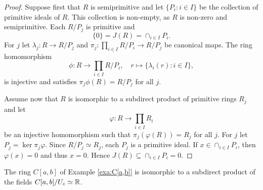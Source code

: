 \begin{proof}
	Suppose first that $R$ is semiprimitive and let $\{P_i:i\in I\}$ be the collection of 
	primitive ideals of $R$. This collection is non-empty, as 
        $R$ is non-zero and semiprimitive. Each $R/P_j$ is primitive and 
	\[
 \{0\}=J(R)=\cap_{i\in I}P_i.
 \]
 For $j$ let $\lambda_j\colon R\to
	R/P_j$ and $\pi_j\colon \prod_{i\in I}R/P_i\to R/P_j$ be canonical maps. 
	The ring homomorphism 
	\[
		\phi\colon R\to\prod_{i\in I}R/P_i,\quad
		r\mapsto \{\lambda_i(r):i\in I\},
	\]
	is injective and satisfies $\pi_j\phi(R)=R/P_j$ for all 
	$j$.

	Assume now that $R$ is isomorphic to a subdirect product of primitive rings 
	$R_j$ and let 
    \[
    \varphi\colon R\to\prod_{i\in I}R_i
    \]
    be an injective homomorphism 
	such that $\pi_j(\varphi(R))=R_j$ for all $j$. For $j$ 
	let $P_j=\ker\pi_j\varphi$. Since $R/P_j\simeq R_j$, each $P_j$ is a primitive ideal. 
	If $x\in\cap_{i\in I}P_i$, then $\varphi(x)=0$ and thus $x=0$.
	Hence $J(R)\subseteq\cap_{i\in I} P_i=0$. 
\end{proof}


\begin{example}
	The ring $C[a,b]$ 
	of Example \ref{exa:C[a,b]}
	is isomorphic to a subdirect product of the fields 
	$C[a,b]/U_c\simeq\mathbb{R}$.
\end{example}



